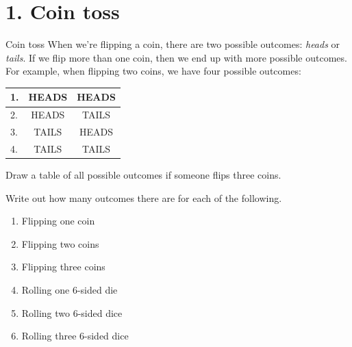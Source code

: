 \documentclass[a4paper,12pt]{book}
\newcounter{question}
\begin{document}
    \section*{1. Coin toss}

        \begin{intro}{Coin toss}
            When we're flipping a coin, there are two possible outcomes:
            \textit{heads} or \textit{tails}. If we flip more than one
            coin, then we end up with more possible outcomes. For example,
            when flipping two coins, we have four possible outcomes:

            \begin{center}
                \begin{tabular}{ | l | c | c | }
                    \hline
                    1. & HEADS & HEADS \\ \hline
                    2. & HEADS & TAILS \\ \hline
                    3. & TAILS & HEADS \\ \hline
                    4. & TAILS & TAILS \\ \hline
                \end{tabular}
            \end{center}
        \end{intro}

        \begin{questionNOGRADE}{\thequestion}
            Draw a table of all possible outcomes if someone flips three coins.
        \end{questionNOGRADE}

        \begin{questionNOGRADE}{\thequestion}
            Write out how many outcomes there are for each of the following.

            \begin{enumerate}
                \item Flipping one coin
                \item Flipping two coins
                \item Flipping three coins
                \item Rolling one 6-sided die
                \item Rolling two 6-sided dice
                \item Rolling three 6-sided dice
            \end{enumerate}
        \end{questionNOGRADE}
\end{document}
